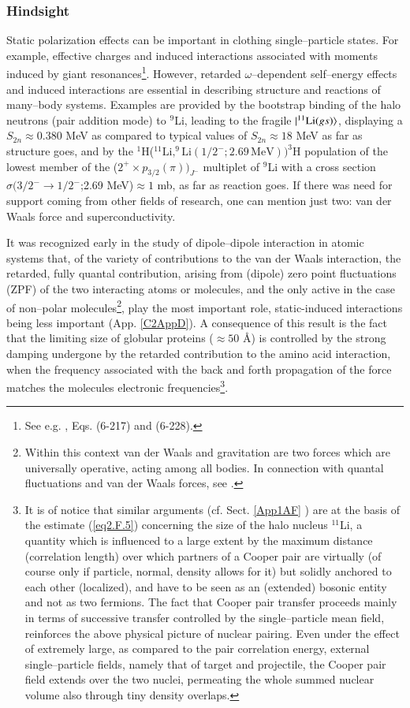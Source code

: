 \begin{subappendices}
\subsubsection{Hindsight}
Static polarization effects can be important in clothing single--particle states. For example, effective charges  and induced interactions associated with moments induced by giant resonances\footnote{See e.g. \cite{Bohr:75}, Eqs. (6-217) and (6-228).}. However, retarded $\omega$--dependent self--energy effects and induced interactions are essential in describing structure and reactions of many--body systems. Examples are provided by the bootstrap binding of the halo neutrons (pair addition mode) to $^9$Li, leading to the fragile $|{^{11}\text{Li}(gs)} \rangle$, displaying a $S_{2n}\approx0.380$ MeV as compared to typical values of $S_{2n}\approx18$ MeV as far as structure goes, and by the $^1$H($^{11}\text{Li},^9\text{Li}(1/2^-;2.69\,\text{MeV}))^3$H population of the lowest member of the ($2^+\times p_{3/2}(\pi))_{J^-}$ multiplet of $^9$Li with a cross section $\sigma(3/2^-\to1/2^-$;2.69 MeV)$\approx 1$ mb, as far as reaction goes.
If there was need for support coming from other fields of research, one can mention just two: van der Waals force and superconductivity.


It was recognized early in the study of dipole--dipole interaction in atomic systems that, of the variety of contributions to the van der Waals interaction, the retarded, fully quantal contribution, arising from (dipole) zero point fluctuations (ZPF) of the two interacting atoms or molecules, and the only active  in the case of non--polar molecules\footnote{Within this context van der Waals and gravitation are two forces which are universally operative, acting among all bodies. In connection with quantal fluctuations and van der Waals forces, see \cite{London:37}.}, play the most important role, static-induced interactions being less important (App. \ref{C2AppD}). A consequence of this result is the fact that the limiting size of globular proteins ($\approx 50$ \AA) is controlled by the strong damping undergone by the retarded contribution to the amino acid interaction, when the frequency associated with the  back and forth propagation of the force  matches the molecules electronic frequencies\footnote{It is of notice that similar arguments (cf. Sect. \ref{App1AF} ) are at the basis of the estimate (\ref{eq2.F.5}) concerning the size of the halo nucleus $^{11}$Li, a quantity which is influenced to a large extent by the maximum distance (correlation length) over which  partners of a Cooper pair are virtually (of course only if particle, normal, density allows for it) but solidly anchored to each other (localized), and have to be seen as an (extended) bosonic entity and not as two fermions. The fact that Cooper pair transfer proceeds mainly in terms of successive transfer controlled by the single--particle mean field, reinforces the above physical picture of nuclear pairing. Even under the effect of extremely large, as compared to the pair correlation energy, external single--particle fields, namely that of target and projectile, the Cooper pair field extends over the two nuclei, permeating the whole summed nuclear volume also through  tiny density overlaps.}.



\end{subappendices}
